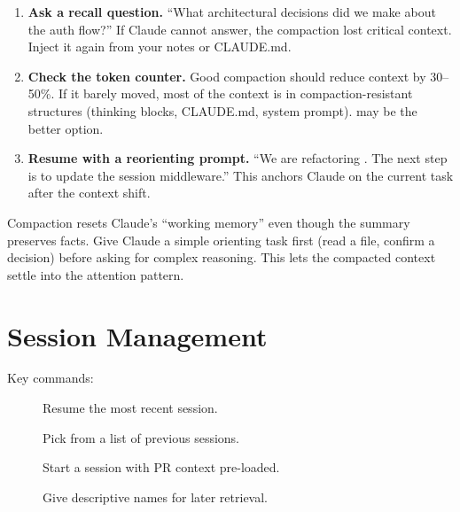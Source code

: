 \begin{enumerate}
  \item \textbf{Ask a recall question.} ``What architectural decisions
    did we make about the auth flow?'' If Claude cannot answer, the
    compaction lost critical context. Inject it again from your notes
    or CLAUDE.md.
  \item \textbf{Check the token counter.} Good compaction should
    reduce context by 30--50\%. If it barely moved, most of the
    context is in compaction-resistant structures (thinking blocks,
    CLAUDE.md, system prompt).  may be the better option.
  \item \textbf{Resume with a reorienting prompt.} ``We are refactoring
    . The next step is to update the session middleware.''
    This anchors Claude on the current task after the context shift.
\end{enumerate}

\begin{warnbox}
Compaction resets Claude's ``working memory'' even though the summary
preserves facts. Give Claude a simple orienting task first (read a file,
confirm a decision) before asking for complex reasoning. This lets
the compacted context settle into the attention pattern.
\end{warnbox}

\section{Session Management}
\label{sec:sessions}


 Key commands:

\begin{description}
  \item[] Resume the most recent session.
  \item[] Pick from a list of previous sessions.
  \item[] Start a session with PR context pre-loaded.
  \item[] Give descriptive names for later retrieval.
\end{description}

